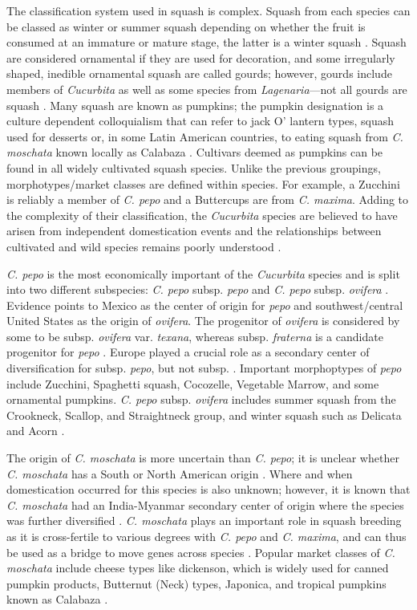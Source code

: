 \documentclass[utf8]{FrontiersinHarvard} %
\begin{document}
The classification system used in squash is complex.
Squash from each species can be classed as winter or summer squash depending on whether the fruit is consumed at an immature or mature stage, the latter is a winter squash \citep{Loy2004}.
Squash are considered ornamental if they are used for decoration, and some irregularly shaped, inedible ornamental squash are called gourds; however, gourds include members of \emph{Cucurbita} as well as some species from \emph{Lagenaria}---not all gourds are squash \citep{Paris2015}.
Many squash are known as pumpkins; the pumpkin designation is a culture dependent colloquialism that can refer to jack O' lantern types, squash used for desserts or, in some Latin American countries, to eating squash from \emph{C. moschata} known locally as Calabaza \citep{Ferriol}.
Cultivars deemed as pumpkins can be found in all widely cultivated squash species.
Unlike the previous groupings, morphotypes/market classes are defined within species.
For example, a Zucchini is reliably a member of \emph{C. pepo} and a Buttercups are from \emph{C. maxima}.
Adding to the complexity of their classification, the \emph{Cucurbita} species are believed to have arisen from independent domestication events and the relationships between cultivated and wild species remains poorly understood \citep{Kates2017}.

\emph{C. pepo} is the most economically important of the \emph{Cucurbita} species and is split into two different subspecies: \emph{C. pepo} subsp. \emph{pepo} and \emph{C. pepo} subsp. \emph{ovifera} \citep{Xanthopoulou2019}.
Evidence points to Mexico as the center of origin for \emph{pepo} and southwest/central United States as the origin of \emph{ovifera}. The progenitor of \emph{ovifera} is considered by some to be subsp. \emph{ovifera} var. \emph{texana}, whereas subsp. \emph{fraterna} is a candidate progenitor for \emph{pepo} \citep{Kates2017}.
Europe played a crucial role as a secondary center of diversification for subsp. \emph{pepo}, but not subsp. \citep{Lust2016}.
Important morphoptypes of \emph{pepo} include Zucchini, Spaghetti squash, Cocozelle, Vegetable Marrow, and some ornamental pumpkins.
\emph{C. pepo} subsp. \emph{ovifera} includes summer squash from the Crookneck, Scallop, and Straightneck group, and winter squash such as Delicata and Acorn \citep{Paris2012}.

The origin of \emph{C. moschata} is more uncertain than \emph{C. pepo}; it is unclear whether \emph{C. moschata} has a South or North American origin \citep{Chomicki2020}.
Where and when domestication occurred for this species is also unknown; however, it is known that \emph{C. moschata} had an India-Myanmar secondary center of origin where the species was further diversified \citep{Sun2017}.
\emph{C. moschata} plays an important role in squash breeding as it is cross-fertile to various degrees with \emph{C. pepo} and \emph{C. maxima}, and can thus be used as a bridge to move genes across species \citep{Sun2017}.
Popular market classes of \emph{C. moschata} include cheese types like dickenson, which is widely used for canned pumpkin products, Butternut (Neck) types, Japonica, and tropical pumpkins known as Calabaza \citep{Ferriol}.
\end{document}
